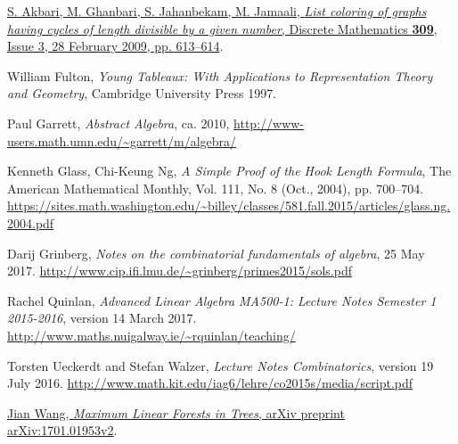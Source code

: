 \documentclass[numbers=enddot,12pt,final,onecolumn,notitlepage]{scrartcl}%
\theoremstyle{definition}
\begin{document}
\begin{thebibliography}{9999999999}                                                                                       %

\href{http://www.sciencedirect.com/science/article/pii/S0012365X08005244}{S. Akbari, M. Ghanbari, S. Jahanbekam, M. Jamaali, \textit{List coloring of graphs having cycles of length divisible by a given number}, Discrete Mathematics \textbf{309}, Issue 3, 28 February 2009, pp. 613--614}.

William Fulton, \textit{Young Tableaux: With
Applications to Representation Theory and Geometry}, Cambridge University
Press 1997.

Paul Garrett,
\textit{Abstract Algebra},
ca. 2010,
\newline\url{http://www-users.math.umn.edu/~garrett/m/algebra/}

Kenneth Glass, Chi-Keung Ng,
\textit{A Simple Proof of the Hook Length Formula},
The American Mathematical Monthly,
Vol. 111, No. 8 (Oct., 2004), pp. 700--704.
\newline\url{https://sites.math.washington.edu/~billey/classes/581.fall.2015/articles/glass.ng.2004.pdf}

Darij Grinberg, \textit{Notes on the combinatorial
fundamentals of algebra}, 25 May 2017.
\newline\url{http://www.cip.ifi.lmu.de/~grinberg/primes2015/sols.pdf}

Rachel Quinlan,
\textit{Advanced Linear Algebra MA500-1: Lecture Notes
Semester 1 2015-2016},
version 14 March 2017.
\newline\url{http://www.maths.nuigalway.ie/~rquinlan/teaching/}

Torsten Ueckerdt and Stefan Walzer,
\textit{Lecture Notes Combinatorics},
version 19 July 2016.
\newline\url{http://www.math.kit.edu/iag6/lehre/co2015s/media/script.pdf}

\href{http://lanl.arxiv.org/abs/1701.01953v2}{Jian Wang,
\textit{Maximum Linear Forests in Trees},
arXiv preprint arXiv:1701.01953v2}.

\end{thebibliography}
\end{document}
